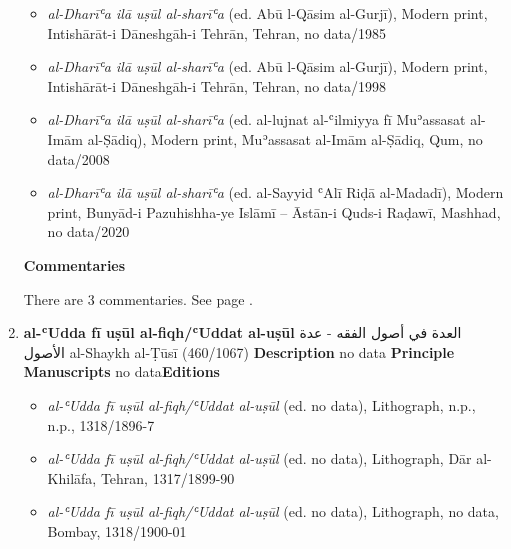\documentclass{article}
\begin{document}
\begin{enumerate}
\begin{itemize}
        \item \emph{al-Dharīʿa ilā uṣūl al-sharīʿa} (ed. Abū l-Qāsim al-Gurjī), Modern print, Intishārāt-i Dāneshgāh-i Tehrān, Tehran, no data/1985
        
        \item \emph{al-Dharīʿa ilā uṣūl al-sharīʿa} (ed. Abū l-Qāsim al-Gurjī), Modern print, Intishārāt-i Dāneshgāh-i Tehrān, Tehran, no data/1998
        
        \item \emph{al-Dharīʿa ilā uṣūl al-sharīʿa} (ed. al-lujnat al-ʿilmiyya fī Muʾassasat al-Imām al-Ṣādiq), Modern print, Muʾassasat al-Imām al-Ṣādiq, Qum, no data/2008
        
        \item \emph{al-Dharīʿa ilā uṣūl al-sharīʿa} (ed. al-Sayyid ʿAlī Riḍā al-Madadī), Modern print, Bunyād-i Pazuhishha-ye Islāmī – Āstān-i Quds-i Raḍawī, Mashhad, no data/2020
        \end{itemize}
\textbf{Commentaries}

There are 3 commentaries. See page \pageref{al-Dharīʿa ilā uṣūl al-sharīʿa commentary}. 

      \item \textbf{al-ʿUdda fī uṣūl al-fiqh/ʿUddat al-uṣūl}
        \newline
        \textarabic{العدة في أصول الفقه - عدة الأصول}
        \newline
        al-Shaykh al-Ṭūsī
        \newline
        (460/1067)
        \newline
        \newline
        \textbf{Description}
        \newline	
        no data
        \newline
        \newline
    \textbf{Principle Manuscripts}
\newline
no data\newline\textbf{Editions}
\begin{itemize}
        \item \emph{al-ʿUdda fī uṣūl al-fiqh/ʿUddat al-uṣūl} (ed. no data), Lithograph, n.p., n.p., 1318/1896-7
        
        \item \emph{al-ʿUdda fī uṣūl al-fiqh/ʿUddat al-uṣūl} (ed. no data), Lithograph, Dār al-Khilāfa, Tehran, 1317/1899-90
        
        \item \emph{al-ʿUdda fī uṣūl al-fiqh/ʿUddat al-uṣūl} (ed. no data), Lithograph, no data, Bombay, 1318/1900-01
        

\end{itemize}
\end{enumerate}
\end{document}
